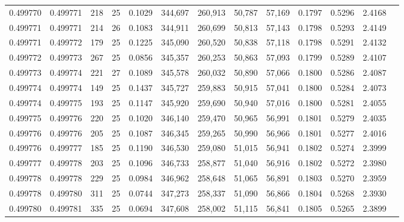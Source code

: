 \begin{tabular}{rrrrrrrrrrrrr}
0.499770 & 0.499771 & 218 &  25 &                                     0.1029 & 344,697 & 260,913 &  50,787 &  57,169 & 0.1797 & 0.5296 & 2.4168 \\
0.499771 & 0.499771 & 214 &  26 &                                     0.1083 & 344,911 & 260,699 &  50,813 &  57,143 & 0.1798 & 0.5293 & 2.4149 \\
0.499771 & 0.499772 & 179 &  25 &                                     0.1225 & 345,090 & 260,520 &  50,838 &  57,118 & 0.1798 & 0.5291 & 2.4132 \\
0.499772 & 0.499773 & 267 &  25 &                                     0.0856 & 345,357 & 260,253 &  50,863 &  57,093 & 0.1799 & 0.5289 & 2.4107 \\
0.499773 & 0.499774 & 221 &  27 &                                     0.1089 & 345,578 & 260,032 &  50,890 &  57,066 & 0.1800 & 0.5286 & 2.4087 \\
0.499774 & 0.499774 & 149 &  25 &                                     0.1437 & 345,727 & 259,883 &  50,915 &  57,041 & 0.1800 & 0.5284 & 2.4073 \\
0.499774 & 0.499775 & 193 &  25 &                                     0.1147 & 345,920 & 259,690 &  50,940 &  57,016 & 0.1800 & 0.5281 & 2.4055 \\
0.499775 & 0.499776 & 220 &  25 &                                     0.1020 & 346,140 & 259,470 &  50,965 &  56,991 & 0.1801 & 0.5279 & 2.4035 \\
0.499776 & 0.499776 & 205 &  25 &                                     0.1087 & 346,345 & 259,265 &  50,990 &  56,966 & 0.1801 & 0.5277 & 2.4016 \\
0.499776 & 0.499777 & 185 &  25 &                                     0.1190 & 346,530 & 259,080 &  51,015 &  56,941 & 0.1802 & 0.5274 & 2.3999 \\
0.499777 & 0.499778 & 203 &  25 &                                     0.1096 & 346,733 & 258,877 &  51,040 &  56,916 & 0.1802 & 0.5272 & 2.3980 \\
0.499778 & 0.499778 & 229 &  25 &                                     0.0984 & 346,962 & 258,648 &  51,065 &  56,891 & 0.1803 & 0.5270 & 2.3959 \\
0.499778 & 0.499780 & 311 &  25 &                                     0.0744 & 347,273 & 258,337 &  51,090 &  56,866 & 0.1804 & 0.5268 & 2.3930 \\
0.499780 & 0.499781 & 335 &  25 &                                     0.0694 & 347,608 & 258,002 &  51,115 &  56,841 & 0.1805 & 0.5265 & 2.3899 \\

\end{tabular}
